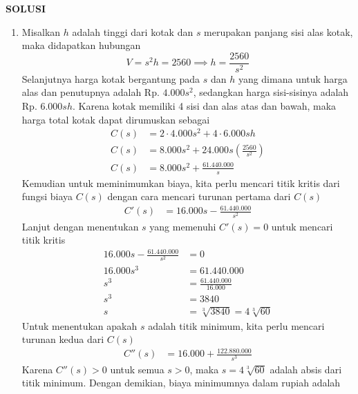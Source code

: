 \documentclass[11pt,a4paper]{article}
\renewcommand{\headrulewidth}{0pt}
\begin{document}
    \newpage
    \fancyfoot{}
    {\centering\textbf{SOLUSI}}
    \renewcommand{\arraystretch}{1.5}
    \renewcommand{\headrulewidth}{1pt}
    \begin{enumerate}
        \item Misalkan $h$ adalah tinggi dari kotak dan $s$ merupakan panjang sisi alas kotak, maka didapatkan hubungan
        \[
            V = s^2 h = 2560 \implies h = \frac{2560}{s^2}
        \]
        Selanjutnya harga kotak bergantung pada $s$ dan $h$ yang dimana untuk harga alas dan penutupnya adalah Rp. \(4.000s^2\), sedangkan harga sisi-sisinya adalah Rp. \(6.000sh\). Karena kotak memiliki 4 sisi dan alas atas dan bawah, maka harga total kotak dapat dirumuskan sebagai
        \begin{align*}
            C(s) &= 2\cdot 4.000s^2 + 4\cdot 6.000sh \\
            C(s) &= 8.000s^2 + 24.000s\left(\frac{2560}{s^2}\right) \\
            C(s) &= 8.000s^2 + \frac{61.440.000}{s} 
        \end{align*}
        Kemudian untuk meminimumkan biaya, kita perlu mencari titik kritis dari fungsi biaya $C(s)$ dengan cara mencari turunan pertama dari $C(s)$
        \begin{align*}
            C'(s) &= 16.000s - \frac{61.440.000}{s^2} 
        \end{align*}
        Lanjut dengan menentukan $s$ yang memenuhi $C'(s) = 0$ untuk mencari titik kritis
        \begin{align*}
            16.000s - \frac{61.440.000}{s^2} &= 0 \\
            16.000s^3 &= 61.440.000 \\
            s^3 &= \frac{61.440.000}{16.000} \\
            s^3 &= 3840 \\
            s &= \sqrt[3]{3840}=4\sqrt[3]{60}
        \end{align*}
        Untuk menentukan apakah $s$ adalah titik minimum, kita perlu mencari turunan kedua dari $C(s)$
        \begin{align*}
            C''(s) &= 16.000 + \frac{122.880.000}{s^3}
        \end{align*}
        Karena $C''(s) > 0$ untuk semua $s > 0$, maka $s=4\sqrt[3]{60}$ adalah absis dari titik minimum. Dengan demikian, biaya minimumnya dalam rupiah adalah

\end{enumerate}
\end{document}
